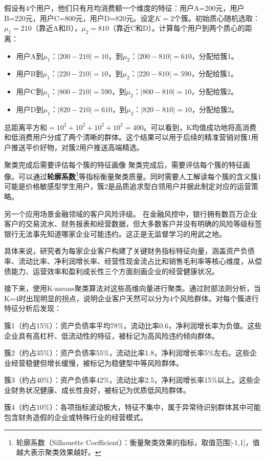 假设有4个用户，他们只有月均消费额一个维度的特征：用户A=200元，用户B=220元，用户C=800元，用户D=820元。设定$K=2$个簇。初始质心随机选取：$\mu_1=210$（靠近A和B），$\mu_2=810$（靠近C和D）。计算每个用户到两个质心的距离：
\begin{itemize}
\item 用户A到$\mu_1$：$|200-210|=10$，到$\mu_2$：$|200-810|=610$，分配给簇1。
\item 用户B到$\mu_1$：$|220-210|=10$，到$\mu_2$：$|220-810|=590$，分配给簇1。
\item 用户C到$\mu_1$：$|800-210|=590$，到$\mu_2$：$|800-810|=10$，分配给簇2。
\item 用户D到$\mu_1$：$|820-210|=610$，到$\mu_2$：$|820-810|=10$，分配给簇2。
\end{itemize}
总距离平方和$=10^2+10^2+10^2+10^2=400$。可以看到，K均值成功地将高消费和低消费用户分成了两个清晰的群体。这个结果可以用于后续的精准营销对簇1用户推送平价好物，对簇2用户推送高端精选。

聚类完成后需要评估每个簇的特征画像 聚类完成后，需要评估每个簇的特征画像。可以通过\textbf{轮廓系数}\footnote{轮廓系数（Silhouette Coefficient）：衡量聚类效果的指标，取值范围[-1,1]，值越大表示聚类效果越好。}等指标衡量聚类质量。同时需要人工解读每个簇的含义簇1可能是价格敏感型学生用户，簇2是品质追求型白领用户并据此制定对应的运营策略。

另一个应用场景金融领域的客户风险评级。 在金融风控中，银行拥有数百万企业客户的交易流水、财务报表和经营数据，但大多数客户并没有明确的风险等级标签银行无法事先知道哪家企业可能违约。这正是无监督学习的用武之地。

具体来说，研究者为每家企业客户构建了关键财务指标特征向量，涵盖资产负债率、流动比率、净利润增长率、经营性现金流占比和销售毛利率等核心维度，从偿债能力、运营效率和盈利成长性三个方面刻画企业的经营健康状况。

接下来，使用K-means聚类算法对这些高维向量进行聚类。通过肘部法则分析，当K=4时出现明显的拐点，说明企业客户天然可以分为4个风险群体。对每个簇进行特征分析后发现：

簇1（约占15\%）：资产负债率平均78\%，流动比率0.6，净利润增长率为负值。这些企业具有高杠杆、低流动性的特征，被标记为高风险违约倾向群体。

簇2（约占35\%）：资产负债率55\%，流动比率1.8，净利润增长率5\%左右。这些企业经营稳健但增长缓慢，被标记为稳健型中等风险群体。

簇3（约占40\%）：资产负债率42\%，流动比率2.5，净利润增长率15\%以上。这些企业财务状况健康、成长性良好，被标记为优质低风险群体。

簇4（约占10\%）：各项指标波动极大，特征不集中，属于异常待识别群体其中可能包含财务造假的企业或特殊行业的经营模式。

